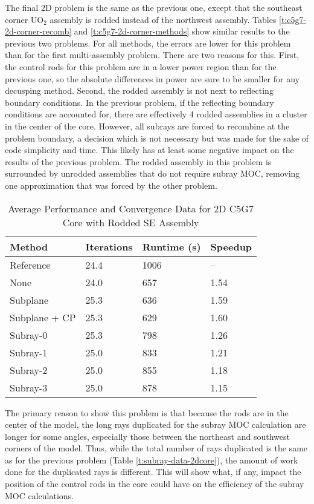 The final 2D problem is the same as the previous one, except that the southeast corner UO$_2$ assembly is rodded instead of the northwest assembly.  Tables \ref{t:c5g7-2d-corner-recomb} and \ref{t:c5g7-2d-corner-methods} show similar results to the previous two problems.  For all methods, the errors are lower for this problem than for the first multi-assembly problem.  There are two reasons for this.  First, the control rods for this problem are in a lower power region than for the previous one, so the absolute differences in power are sure to be smaller for any decusping method.  Second, the rodded assembly is not next to reflecting boundary conditions.  In the previous problem, if the reflecting boundary conditions are accounted for, there are effectively 4 rodded assemblies in a cluster in the center of the core.  However, all subrays are forced to recombine at the problem boundary, a decision which is not necessary but was made for the sake of code simplicity and time.  This likely has at least some negative impact on the results of the previous problem.  The rodded assembly in this problem is surrounded by unrodded assemblies that do not require subray MOC, removing one approximation that was forced by the other problem.

\begin{table}[h]
    \centering
    \caption[2D C5G7 Core Performance Data, Corner Assembly]{Average Performance and Convergence Data for 2D C5G7 Core with Rodded SE Assembly}\label{t:subray-performance-2dcoreSE}
    \begin{tabular}{l l l l}\toprule
        Method & Iterations & Runtime (s) & Speedup \\\midrule
Reference     & 24.4 & 1006 & --  \\
None          & 24.0 & 657 & 1.54 \\
Subplane      & 25.3 & 636 & 1.59 \\
Subplane + CP & 25.3 & 629 & 1.60 \\
Subray-0      & 25.3 & 798 & 1.26 \\
Subray-1      & 25.0 & 833 & 1.21 \\
Subray-2      & 25.0 & 855 & 1.18 \\
Subray-3      & 25.0 & 878 & 1.15 \\
        \bottomrule
    \end{tabular}
\end{table}

The primary reason to show this problem is that because the rods are in the center of the model, the long rays duplicated for the subray MOC calculation are longer for some angles, especially those between the northeast and southwest corners of the model.  Thus, while the total number of rays duplicated is the same as for the previous problem (Table \ref{t:subray-data-2dcore}), the amount of work done for the duplicated rays is different.  This will show what, if any, impact the position of the control rods in the core could have on the efficiency of the subray MOC calculations.

